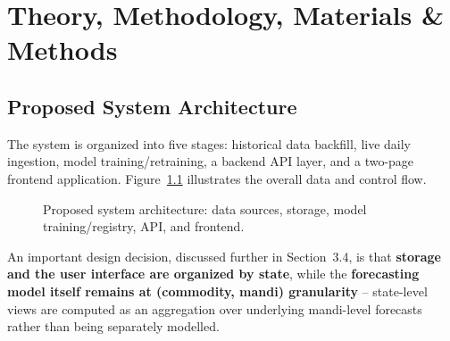 \chapter{Theory, Methodology, Materials \& Methods}

\section{Proposed System Architecture}
The system is organized into five stages: historical data backfill, live
daily ingestion, model training/retraining, a backend API layer, and a
two-page frontend application. Figure~\ref{fig:architecture} illustrates
the overall data and control flow.

\begin{figure}[h]
\centering
{}
\caption{Proposed system architecture: data sources, storage, model
training/registry, API, and frontend.}
\label{fig:architecture}
\end{figure}

An important design decision, discussed further in Section~3.4, is that
\textbf{storage and the user interface are organized by state}, while the
\textbf{forecasting model itself remains at (commodity, mandi)
granularity} -- state-level views are computed as an aggregation over
underlying mandi-level forecasts rather than being separately modelled.

